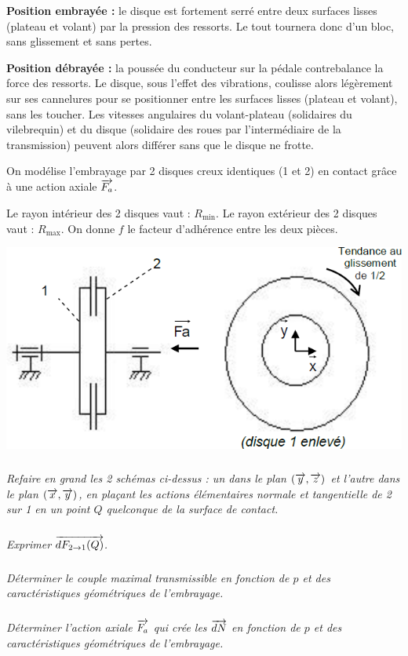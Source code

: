 \documentclass[10pt,fleqn]{article} %
\begin{document}
\begin{multicols}{2}
\begin{multicols}{2}
\textbf{Position embrayée :} le disque est fortement serré entre deux surfaces lisses (plateau et volant) par la 
pression des ressorts. Le tout tournera donc d'un bloc, sans glissement et sans pertes. 

\textbf{Position débrayée :} la poussée du conducteur sur la pédale contrebalance la force des ressorts. Le disque, sous l'effet des vibrations, coulisse alors légèrement sur ses cannelures pour se positionner entre les surfaces lisses (plateau et volant), sans les toucher. Les vitesses angulaires du volant-plateau (solidaires du vilebrequin) et du disque (solidaire des roues par l'intermédiaire de la transmission) peuvent alors différer 
sans que le disque ne frotte. 

On modélise l'embrayage par 2 disques creux identiques (1 et 2) en contact grâce à une 
action axiale $\overrightarrow{F_a}$. 
 
Le rayon intérieur des 2 disques vaut : $R_{\text{min}}$. 
Le rayon extérieur des 2 disques vaut : $R_{\text{max}}$. 
On donne $f$ le facteur d’adhérence entre les deux pièces. 



\begin{center}
\includegraphics[width=.9\linewidth]{images/fig_07}
\end{center}


\subparagraph{}
\textit{Refaire en grand les 2 schémas ci-dessus : un dans le plan $(\overrightarrow{y}, \overrightarrow{z})$ et l’autre dans le plan $(\overrightarrow{x}, \overrightarrow{y})$, en plaçant les actions élémentaires normale et tangentielle de 2 sur 1 en un point $Q$ quelconque de la surface de contact.}

\subparagraph{}
\textit{Exprimer $\overrightarrow{dF_{2\rightarrow 1}(Q)}$.}

\subparagraph{}
\textit{Déterminer le couple maximal transmissible en fonction de $p$ et des caractéristiques 
géométriques de l’embrayage.}

\subparagraph{}
\textit{Déterminer l’action axiale $\overrightarrow{F_a}$ qui crée les $\overrightarrow{dN}$ en fonction de $p$ et des caractéristiques géométriques de l’embrayage.}


\end{multicols}
\end{multicols}
\end{document}
